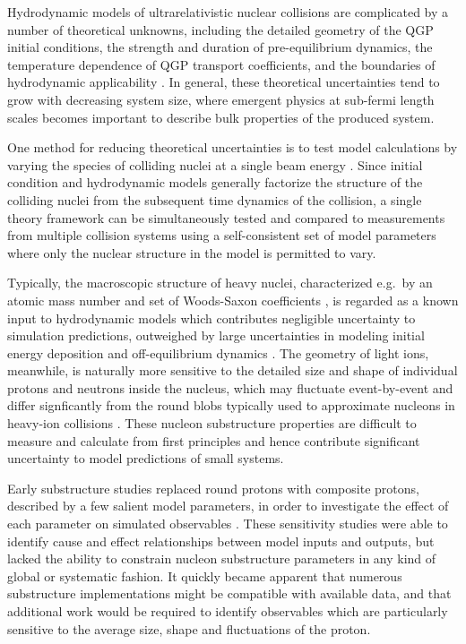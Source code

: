 \documentclass[aps,prc,reprint,amsmath,nofootinbib]{revtex4-1}
\begin{document}
Hydrodynamic models of ultrarelativistic nuclear collisions are complicated by a number of theoretical unknowns, including the detailed geometry of the QGP initial conditions, the strength and duration of pre-equilibrium dynamics, the temperature dependence of QGP transport coefficients, and the boundaries of hydrodynamic applicability \cite{Niemi:2014lha, deSouza:2015ena, Ollitrault:2012cm, Song:2012ua}.
In general, these theoretical uncertainties tend to grow with decreasing system size, where emergent physics at sub-fermi length scales becomes important to describe bulk properties of the produced system.

One method for reducing theoretical uncertainties is to test model calculations by varying the species of colliding nuclei at a single beam energy \cite{Adare:2015bua, Schenke:2014tga, Aidala:2018mcw, Adare:2017wlc, Adamczyk:2015obl, Shen:2016zpp, Aidala:2017ajz, Adare:2006ti}.
Since initial condition and hydrodynamic models generally factorize the structure of the colliding nuclei from the subsequent time dynamics of the collision, a single theory framework can be simultaneously tested and compared to measurements from multiple collision systems using a self-consistent set of model parameters where only the nuclear structure in the model is permitted to vary.

Typically, the macroscopic structure of heavy nuclei, characterized e.g.\ by an atomic mass number and set of Woods-Saxon coefficients \cite{MOLLER1995185, DEVRIES1987495}, is regarded as a known input to hydrodynamic models which contributes negligible uncertainty to simulation predictions, outweighed by large uncertainties in modeling initial energy deposition and off-equilibrium dynamics \cite{Niemi:2014lha, Song:2011hk, Retinskaya:2013gca, Liu:2015nwa, Kurkela:2016vts}.
The geometry of light ions, meanwhile, is naturally more sensitive to the detailed size and shape of individual protons and neutrons inside the nucleus, which may fluctuate event-by-event and differ signficantly from the round blobs typically used to approximate nucleons in heavy-ion collisions \cite{Schenke:2014zha, Welsh:2016siu, Moreland:2017kdx, Schenke:2014gaa, Schlichting:2014ipa}.
These nucleon substructure properties are difficult to measure and calculate from first principles and hence contribute significant uncertainty to model predictions of small systems.

Early substructure studies replaced round protons with composite protons, described by a few salient model parameters, in order to investigate the effect of each parameter on simulated observables \cite{Adler:2013aqf, Mitchell:2016jio, Welsh:2016siu, Broniowski:2016pvx, Bozek:2017jog}.
These sensitivity studies were able to identify cause and effect relationships between model inputs and outputs, but lacked the ability to constrain nucleon substructure parameters in any kind of global or systematic fashion.
It quickly became apparent that numerous substructure implementations might be compatible with available data, and that additional work would be required to identify observables which are particularly sensitive to the average size, shape and fluctuations of the proton.
\end{document}
